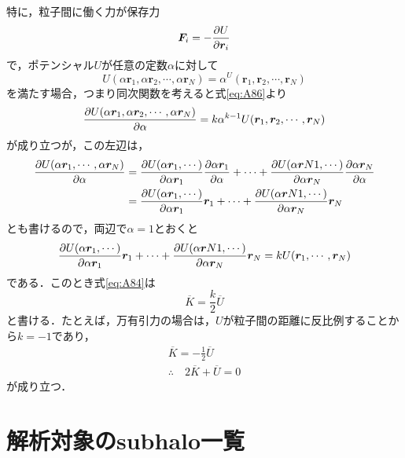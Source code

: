 \documentclass[main.tex]{subfiles}
\begin{document}
	特に，粒子間に働く力が保存力
	\begin{equation}
		\bm{F}_i = - \pdv{U}{\bm{r}_i}
	\end{equation}
	で，ポテンシャル$U$が任意の定数$\alpha$に対して
	\begin{equation}
		U(\alpha \bm{r}_1,\alpha \bm{r}_2,\cdots,\alpha \bm{r}_N) = \alpha^ U(\bm{r}_1, \bm{r}_2,\cdots,\bm{r}_N) \label{eq:A86}
	\end{equation}
	を満たす場合，つまり同次関数を考えると式\eqref{eq:A86}より
	\begin{equation}
		\pdv{U(\alpha \bm{r}_1,\alpha \bm{r}_2,\cdots,\alpha \bm{r}_N)}{\alpha} = k \alpha^{k-1} U(\bm{r}_1, \bm{r}_2,\cdots,\bm{r}_N)
	\end{equation}
	が成り立つが，この左辺は，
	\begin{align}
		\pdv{U(\alpha \bm{r}_1,\cdots,\alpha \bm{r}_N)}{\alpha} 
		&= \pdv{U(\alpha \bm{r}_1,\cdots)}{\alpha \bm{r}_1} \pdv{\alpha \bm{r}_1}{\alpha} +
		\cdots +
		\pdv{U(\alpha \bm{r}N1,\cdots)}{\alpha \bm{r}_N} \pdv{\alpha \bm{r}_N}{\alpha} \\
		&= \pdv{U(\alpha \bm{r}_1,\cdots)}{\alpha \bm{r}_1} \bm{r}_1 +
		\cdots +
		\pdv{U(\alpha \bm{r}N1,\cdots)}{\alpha \bm{r}_N}\bm{r}_N
	\end{align}
	とも書けるので，両辺で$\alpha = 1$とおくと
	\begin{equation}
		\pdv{U(\alpha \bm{r}_1,\cdots)}{\alpha \bm{r}_1} \bm{r}_1 +
		\cdots +
		\pdv{U(\alpha \bm{r}N1,\cdots)}{\alpha \bm{r}_N}\bm{r}_N
		= kU(\bm{r}_1, \cdots, \bm{r}_N)
	\end{equation}
	である．このとき式\eqref{eq:A84}は
	\begin{equation}
		\overline{K} = \frac{k}{2} \overline{U}
	\end{equation}
	と書ける．たとえば，万有引力の場合は，$U$が粒子間の距離に反比例することから$k = -1$であり，
	\begin{align}
		\overline{K} = - \frac{1}{2} \overline{U}\\
		\therefore \quad 2\overline{K} + \overline{U} =0 \label{eq:virial}
	\end{align}
	が成り立つ．
	
	\section{解析対象のsubhalo一覧}
	
\end{document}
